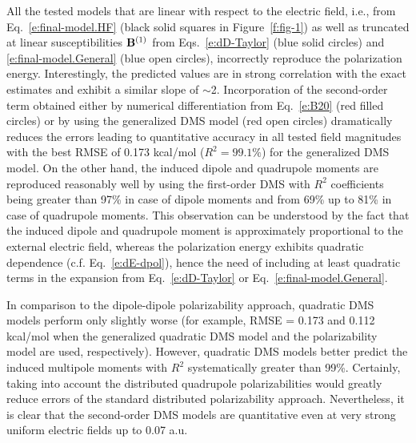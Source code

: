 \documentclass[aip,amsmath,amssymb,reprint,floatfix]{revtex4-1}
\begin{document}
All the tested models that are linear with respect to the electric field,
i.e., from Eq.~\eqref{e:final-model.HF} (black solid squares in Figure~\ref{f:fig-1}) 
as well as truncated at linear susceptibilities ${\bf B}^{(1)}$ 
from Eqs.~\eqref{e:dD-Taylor} (blue solid circles) and \eqref{e:final-model.General} (blue open circles),
incorrectly reproduce the polarization energy.
Interestingly, the predicted values are in strong
correlation with the exact estimates and exhibit a similar slope of $\sim$2.
Incorporation of the second\hyp{}order term
obtained either by numerical differentiation from Eq.~\eqref{e:B20} (red filled circles) 
or by using the generalized DMS model (red open circles)
dramatically reduces the errors
leading to quantitative accuracy in all tested field magnitudes 
with the best RMSE of 0.173 kcal/mol ($R^2=99.1\%$) for the generalized DMS model.
On the other hand, the
induced dipole and quadrupole moments are reproduced reasonably well by
using the first\hyp{}order DMS with $R^2$ coefficients being 
greater than 97\% in case of dipole moments and from 69\% up to 81\% in case of quadrupole moments.
This observation can be understood by the fact that the induced dipole
and quadrupole moment is approximately proportional to the external electric field, whereas the polarization
energy exhibits quadratic dependence (c.f. Eq.~\eqref{e:dE-dpol}), hence the need of including at least
quadratic terms in the expansion from Eq.~\eqref{e:dD-Taylor} or Eq.~\eqref{e:final-model.General}. 

In comparison to the dipole\hyp{}dipole polarizability approach, 
quadratic DMS models perform only slightly worse 
(for example, RMSE = 0.173 and 0.112 kcal/mol when the generalized quadratic DMS
model and the polarizability model are used, respectively).
However, quadratic DMS models better predict the induced multipole moments with
$R^2$ systematically greater than 99\%. 
Certainly, taking into account the distributed quadrupole polarizabilities
would greatly reduce errors of the standard distributed polarizability approach.
Nevertheless, it is clear that the second\hyp{}order
DMS models are quantitative even at very strong uniform electric fields up to 0.07 a.u.
\end{document}
